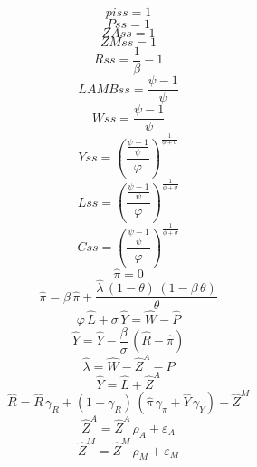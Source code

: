 \begin{dmath*}
piss = 1
\end{dmath*}
\begin{dmath*}
Pss = 1
\end{dmath*}
\begin{dmath*}
ZAss = 1
\end{dmath*}
\begin{dmath*}
ZMss = 1
\end{dmath*}
\begin{dmath*}
Rss = \frac{1}{{{\beta}}}-1
\end{dmath*}
\begin{dmath*}
LAMBss = \frac{{{\psi}}-1}{{{\psi}}}
\end{dmath*}
\begin{dmath*}
Wss = \frac{{{\psi}}-1}{{{\psi}}}
\end{dmath*}
\begin{dmath*}
Yss = \left(\frac{\frac{{{\psi}}-1}{{{\psi}}}}{{{\varphi}}}\right)^{\frac{1}{{{\phi}}+{{\sigma}}}}
\end{dmath*}
\begin{dmath*}
Lss = \left(\frac{\frac{{{\psi}}-1}{{{\psi}}}}{{{\varphi}}}\right)^{\frac{1}{{{\phi}}+{{\sigma}}}}
\end{dmath*}
\begin{dmath*}
Css = \left(\frac{\frac{{{\psi}}-1}{{{\psi}}}}{{{\varphi}}}\right)^{\frac{1}{{{\phi}}+{{\sigma}}}}
\end{dmath*}
\begin{dmath}
{{\hat{\pi}}}=0
\end{dmath}
\begin{dmath}
{{\hat{\pi}}}={{\beta}}\, {{\hat{\pi}}}+\frac{{{\hat{\lambda}}}\, \left(1-{{\theta}}\right)\, \left(1-{{\beta}}\, {{\theta}}\right)}{{{\theta}}}
\end{dmath}
\begin{dmath}
{{\varphi}}\, {{\hat{L}}}+{{\sigma}}\, {{\hat{Y}}}={{\hat{W}}}-{{\hat{P}}}
\end{dmath}
\begin{dmath}
{{\hat{Y}}}={{\hat{Y}}}-\frac{{{\beta}}}{{{\sigma}}}\, \left({{\hat{R}}}-{{\hat{\pi}}}\right)
\end{dmath}
\begin{dmath}
{{\hat{\lambda}}}={{\hat{W}}}-{{\hat{Z}^A}}-{{\hat{P}}}
\end{dmath}
\begin{dmath}
{{\hat{Y}}}={{\hat{L}}}+{{\hat{Z}^A}}
\end{dmath}
\begin{dmath}
{{\hat{R}}}={{\hat{R}}}\, {{\gamma_R}}+\left(1-{{\gamma_R}}\right)\, \left({{\hat{\pi}}}\, {{\gamma_\pi}}+{{\hat{Y}}}\, {{\gamma_Y}}\right)+{{\hat{Z}^M}}
\end{dmath}
\begin{dmath}
{{\hat{Z}^A}}={{\hat{Z}^A}}\, {{\rho_A}}+{{\varepsilon_A}}
\end{dmath}
\begin{dmath}
{{\hat{Z}^M}}={{\hat{Z}^M}}\, {{\rho_M}}+{{\varepsilon_M}}
\end{dmath}
